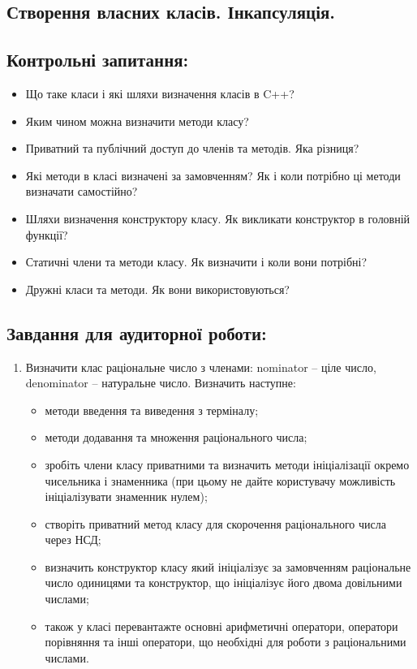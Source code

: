 \documentclass[a5paper,titlepage,openany,twoside,
]
{book_unv}%
\begin{document}
\begin{enumerate}
\begin{enumerate}
\chapter{Створення власних класів. Інкапсуляція.}
%

\section{Контрольні запитання:}
\begin{itemize}
\item
Що таке класи і які шляхи визначення класів в C++?
\item
Яким чином можна визначити методи класу?
\item
Приватний та публічний доступ до членів та методів. Яка різниця?
\item
Які методи в класі визначені за замовченням? Як і коли потрібно ці
методи визначати самостійно?
\item 
Шляхи визначення конструктору класу. Як викликати конструктор в
головній функції?
\item
Статичні члени та методи класу. Як визначити і коли вони потрібні?
\item 
Дружні класи та методи. Як вони використовуються?
\end{itemize}

\section{Завдання для аудиторної роботи:}
\begin{enumerate}
\def\labelenumi{\arabic{enumi})}

\item 
Визначити клас раціональне число з членами: nominator -- ціле
число, denominator -- натуральне число. Визначить наступне:
\begin{itemize}
\item
методи введення та виведення з терміналу;
\item 
методи додавання та множення раціонального числа;
\item
зробіть члени класу приватними та визначить методи ініціалізації
окремо чисельника і знаменника (при цьому не дайте користувачу
можливість ініціалізувати знаменник нулем);
\item
створіть приватний метод класу для скорочення раціонального числа
через НСД;
\item визначить конструктор класу який ініціалізує за замовченням
раціональне число одиницями та конструктор, що ініціалізує його двома
довільними числами;
\item також у класі перевантажте основні арифметичні оператори, оператори
порівняння та інші оператори, що необхідні для роботи з раціональними
числами.
\end{itemize}


\end{enumerate}
\end{enumerate}
\end{enumerate}
\end{document}
